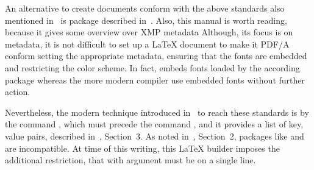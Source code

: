 An alternative to create documents conform with the above standards also mentioned in~\cite{XMPlatex} is package  
described in~\cite{HyperXmpP}. 
Also, this manual is worth reading, because it gives some overview over XMP metadata 
Although, its focus is on metadata, it is not difficult to set up a \LaTeX{} document to make it PDF/A conform 
setting the appropriate metadata, ensuring that the fonts are embedded and restricting the color scheme. 
In fact,  embeds  fonts loaded by the according package 
whereas the more modern compiler use embedded fonts without further action. 

Nevertheless, the modern technique introduced in~\cite{XMPlatex} to reach these standards 
is by the command , which must precede the command , 
and it provides a list of key, value pairs, described in~\cite{DocMetaDataSuppCode25}, Section~3. 
As noted in~\cite{L3PdfMeta}, Section~2, packages like  and  are incompatible. 
At time of this writing, this \LaTeX{} builder imposes the additional restriction, that  with argument 
must be on a single line. %

